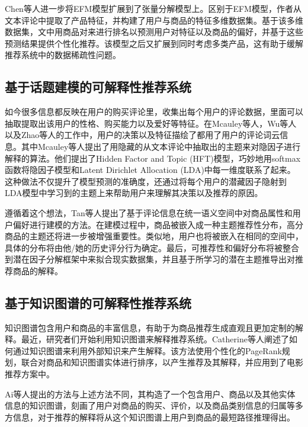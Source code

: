 
Chen等人\cite{chen2016learning}进一步将EFM模型扩展到了张量分解模型上。区别于EFM模型，作者从文本评论中提取了产品特征，并构建了用户与商品的特征多维数据集。基于该多维数据集，文中用商品对来进行排名以预测用户对特征以及商品的偏好，并基于这些预测结果提供个性化推荐。该模型之后又扩展到同时考虑多类产品，这有助于缓解推荐系统中的数据稀疏性问题。

\subsection{基于话题建模的可解释性推荐系统}
如今很多信息都反映在用户的购买评论里，收集出每个用户的评论数据，里面可以抽取提取出该用户的性格、购买能力以及爱好等特征。在Mcauley等人\cite{mcauley2013hidden}，Wu等人\cite{wu2015flame}以及Zhao等人\cite{zhao2015sar}的工作中，用户的决策以及特征描绘了都用了用户的评论词云信息。其中Mcauley等人\cite{mcauley2013hidden}提出了用隐藏的从文本评论中抽取出的主题来对隐因子进行解释的算法。他们提出了Hidden Factor and Topic (HFT)模型，巧妙地用softmax函数将隐因子模型和Latent Dirichlet Allocation (LDA)中每一维度联系了起来。这种做法不仅提升了模型预测的准确度，还通过将每个用户的潜藏因子隐射到LDA模型中学习到的主题上来帮助用户来理解其决策以及推荐的原因。

遵循着这个想法，Tan等人\cite{tan2016rating}提出了基于评论信息在统一语义空间中对商品属性和用户偏好进行建模的方法。在建模过程中，商品被嵌入成一种主题推荐性分布，高分商品的主题还将进一步被增强重要性。类似地，用户也将被嵌入在相同的空间中，具体的分布将由他/她的历史评分行为确定。最后，可推荐性和偏好分布将被整合到潜在因子分解框架中来拟合现实数据集，并且基于所学习的潜在主题推导出对推荐商品的解释。

\subsection{基于知识图谱的可解释性推荐系统}
知识图谱包含用户和商品的丰富信息，有助于为商品推荐生成直观且更加定制的解释。最近，研究者们开始利用知识图谱来解释推荐系统。Catherine等人\cite{catherine2017explainable}阐述了如何通过知识图谱来利用外部知识来产生解释。该方法使用个性化的PageRank规划，联合对商品和知识图谱实体进行排序，以产生推荐及其解释，并应用到了电影推荐方案中。

Ai等人\cite{ai2018learning}提出的方法与上述方法不同，其构造了一个包含用户、商品以及其他实体信息的知识图谱，刻画了用户对商品的购买、评价，以及商品类别信息的归属等多方信息，对于推荐的解释将从这个知识图谱上用户到商品的最短路径推理得出。

